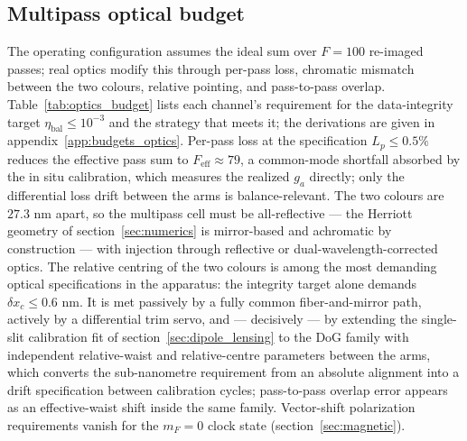 \documentclass[11pt,a4paper]{article}
\begin{document}
\subsection{Multipass optical budget}
\label{sec:optics_budget}
The operating configuration assumes the ideal sum over $F = 100$ re-imaged passes; real optics modify this through per-pass loss, chromatic mismatch between the two colours, relative pointing, and pass-to-pass overlap. Table~\ref{tab:optics_budget} lists each channel's requirement for the data-integrity target $\eta_\text{bal} \leq 10^{-3}$ and the strategy that meets it; the derivations are given in appendix~\ref{app:budgets_optics}. Per-pass loss at the specification $L_p \leq 0.5\%$ reduces the effective pass sum to $F_\text{eff} \approx 79$, a common-mode shortfall absorbed by the in situ calibration, which measures the realized $g_a$ directly; only the differential loss drift between the arms is balance-relevant. The two colours are $27.3$ nm apart, so the multipass cell must be all-reflective --- the Herriott geometry of section~\ref{sec:numerics} is mirror-based and achromatic by construction --- with injection through reflective or dual-wavelength-corrected optics. The relative centring of the two colours is among the most demanding optical specifications in the apparatus: the integrity target alone demands $\delta x_c \leq 0.6$ nm. It is met passively by a fully common fiber-and-mirror path, actively by a differential trim servo, and --- decisively --- by extending the single-slit calibration fit of section~\ref{sec:dipole_lensing} to the DoG family with independent relative-waist and relative-centre parameters between the arms, which converts the sub-nanometre requirement from an absolute alignment into a drift specification between calibration cycles; pass-to-pass overlap error appears as an effective-waist shift inside the same family. Vector-shift polarization requirements vanish for the $m_F = 0$ clock state (section~\ref{sec:magnetic}).
\end{document}
